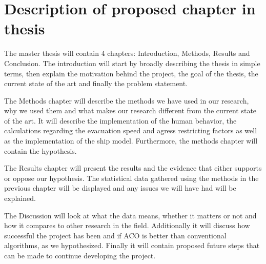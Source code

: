 \chapter{Description of proposed chapter in thesis}
\label{ch:discription}


The master thesis will contain 4 chapters: Introduction, Methods, Results and Conclusion.
The introduction will start by broadly describing the thesis in simple terms, then explain the motivation behind the project,
the goal of the thesis, the current state of the art and finally the problem statement. 

The Methods chapter will describe the methods we have used in our research, why we used them and what makes
our research different from the current state of the art. It will describe the implementation of the human behavior,
the calculations regarding the evacuation speed and agress restricting factors as well as the implementation of the 
ship model. Furthermore, the methods chapter will contain the hypothesis.

The Results chapter will present the results and the evidence that either supports or oppose our hypothesis. The
statistical data gathered using the methods in the previous chapter will be displayed and any issues we will have had
will be explained.

The Discussion will look at what the data means, whether it matters or not and how it compares to other research in the field.
Additionally it will discuss how successful the project has been and if ACO is better than conventional algorithms, as we hypothesized.
Finally it will contain proposed future steps that can be made to continue developing the project.